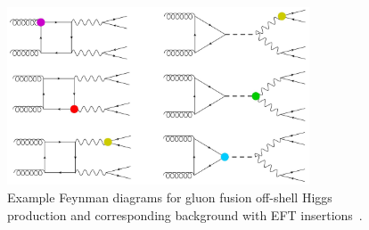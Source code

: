\begin{figure}[!h]
\centering
\includegraphics[width=0.8\textwidth,clip] {figures/EFTdiagrams.jpg}
\caption{Example Feynman diagrams for gluon fusion off-shell Higgs production and corresponding background with EFT insertions~\cite{offshellWGnote}.}
\label{fig:EFTdiagrams}
\end{figure}





